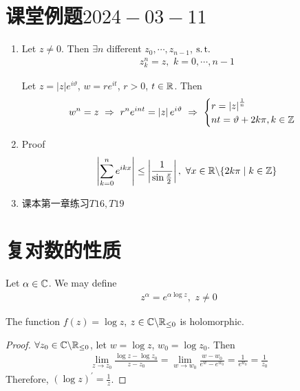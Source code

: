 \section{课堂例题$2024-03-11$}
	\begin{enumerate}
		\item Let $z \neq 0$. Then $\exists n$ different $z_0 , \cdots , z_{n - 1}$, $\operatorname{s.t.}$
		\begin{align}
			z_{k}^{n} = z , \,\, k = 0 , \cdots , n - 1
		\end{align}
	
		\vspace{2em}
		\begin{solution}
			Let $z = \left| z \right| e^{i\vartheta}$, $w = r e^{it}$, $r > 0$, $t \in \mathbb{R}$. Then
			\begin{align}
				w^n = z \,\, \Rightarrow \,\, r^n e^{int} = \left| z \right| e^{i\vartheta} \,\, \Rightarrow \,\, 
				\begin{cases}
					r = \left| z \right|^{\frac{1}{n}} \\
					nt = \vartheta + 2k\pi , k \in \mathbb{Z}
				\end{cases}
			\end{align}
		\end{solution}
	
		\vspace{2em}
		
		\item Proof
		\begin{align}
			\left| \sum_{k = 0}^{n}{e^{ikx}}  \right| \leq \left| \frac{1}{\sin{\frac{x}{2}}} \right| , \,\, \forall x \in \mathbb{R} \backslash \{ 2k\pi \mid k \in \mathbb{Z} \}
		\end{align}
		
		\vspace{2em}
		
		\item 课本第一章练习$T16 , T19$
	\end{enumerate}

\newpage
\section{复对数的性质}
	Let $\alpha \in \mathbb{C}$. We may define
	\begin{align}
		z^\alpha = e^{\alpha \log{z}} , \,\, z \neq 0
	\end{align}
	
	\vspace{2em}
	\begin{proposition}\label{prop 3.3.1}
		The function $f(z) = \log{z}$, $z \in \mathbb{C} \backslash \mathbb{R}_{\leq 0}$ is holomorphic.
		
		\vspace{2em}
		\begin{proof}
			$\forall z_0 \in \mathbb{C} \backslash \mathbb{R}_{\leq 0}$, let $w = \log{z}$, $w_0 = \log{z_0}$. Then
			\begin{align}
				\lim_{z \to z_0}{\frac{\log{z} - \log{z_0}}{z - z_0}} = \lim_{w \to w_0}{\frac{w - w_0}{e^w - e^{w_0}}} = \frac{1}{e^{w_0}} = \frac{1}{z_0}
			\end{align}
			Therefore, $(\log{z})^{'} = \frac{1}{z}$.
		\end{proof}
	\end{proposition}

